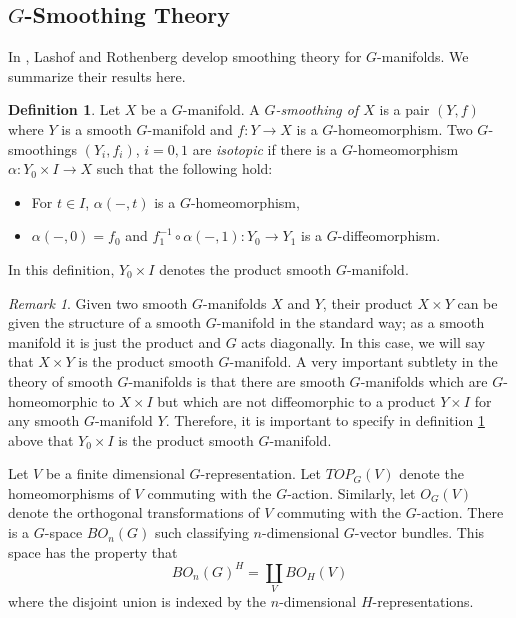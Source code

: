 \documentclass[11pt, twoside]{amsart}
\theoremstyle{plain}
\theoremstyle{definition}
\newtheorem{definition}[theorem]{Definition}
\theoremstyle{remark}
\newtheorem*{remark}{Remark}
\begin{document}
\subsection{$G$-Smoothing Theory}
In \cite{LashofRothenberg}, Lashof and Rothenberg develop smoothing theory for $G$-manifolds.
We summarize their results here.

\begin{definition}\label{def: isotopy of smooth structures}
Let $X$ be a $G$-manifold.
A \emph{$G$-smoothing of $X$} is a pair $(Y,f)$ where $Y$ is a smooth $G$-manifold and $f:Y\rightarrow X$ is a $G$-homeomorphism.
Two $G$-smoothings $(Y_i,f_i)$, $i=0,1$ are \emph{isotopic} if there is a $G$-homeomorphism $\alpha:Y_0\times I\rightarrow X$ such that the following hold:
\begin{itemize}
\item For $t\in I$, $\alpha(-,t)$ is a $G$-homeomorphism,
\item $\alpha(-,0)=f_0$ and $f_1^{-1}\circ\alpha(-,1):Y_0\rightarrow Y_1$ is a $G$-diffeomorphism.
\end{itemize}
In this definition, $Y_0\times I$ denotes the product smooth $G$-manifold.
\end{definition}

\begin{remark}
Given two smooth $G$-manifolds $X$ and $Y$, their product $X\times Y$ can be given the structure of a smooth $G$-manifold in the standard way; as a smooth manifold it is just the product and $G$ acts diagonally.
In this case, we will say that $X\times Y$ is the product smooth $G$-manifold.
A very important subtlety in the theory of smooth $G$-manifolds is that there are smooth $G$-manifolds which are $G$-homeomorphic to $X\times I$ but which are not diffeomorphic to a product $Y\times I$ for any smooth $G$-manifold $Y$.
Therefore, it is important to specify in definition \ref{def: isotopy of smooth structures} above that $Y_0\times I$ is the product smooth $G$-manifold.
\end{remark}

Let $V$ be a finite dimensional $G$-representation.
Let $ TOP_G(V)$ denote the homeomorphisms of $V$ commuting with the $G$-action.
Similarly, let $ O_G(V)$ denote the orthogonal transformations of $V$ commuting with the $G$-action.
There is a $G$-space $BO_n(G)$ such classifying $n$-dimensional $G$-vector bundles.
This space has the property that
\[
BO_n(G)^H=\coprod_{V}BO_H(V)
\]
where the disjoint union is indexed by the $n$-dimensional $H$-representations.
\end{document}
